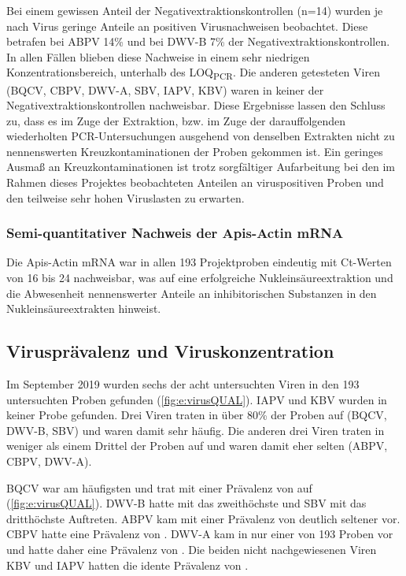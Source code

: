 Bei einem gewissen Anteil der Negativextraktionskontrollen (n=14) wurden je nach Virus geringe Anteile an positiven Virusnachweisen beobachtet. Diese betrafen bei ABPV 14\% und bei DWV-B 7\% der Negativextraktionskontrollen. In allen Fällen blieben diese Nachweise in einem sehr niedrigen Konzentrationsbereich, unterhalb des LOQ\textsubscript{PCR}. Die anderen getesteten Viren (BQCV, CBPV, DWV-A, SBV, IAPV, KBV) waren in keiner der Negativextraktionskontrollen nachweisbar. Diese Ergebnisse lassen den Schluss zu, dass es im Zuge der Extraktion, bzw. im Zuge der darauffolgenden wiederholten PCR-Untersuchungen ausgehend von denselben Extrakten nicht zu nennenswerten Kreuzkontaminationen der Proben gekommen ist. Ein geringes Ausmaß an Kreuzkontaminationen ist trotz sorgfältiger Aufarbeitung bei den im Rahmen dieses Projektes beobachteten Anteilen an viruspositiven Proben und den teilweise sehr hohen Viruslasten zu erwarten.

\subsubsection{Semi-quantitativer Nachweis der Apis-Actin mRNA}

Die Apis-Actin mRNA war in allen 193 Projektproben eindeutig mit Ct-Werten von 16 bis 24 nachweisbar, was auf eine erfolgreiche Nukleinsäureextraktion und die Abwesenheit nennenswerter Anteile an inhibitorischen Substanzen in den Nukleinsäureextrakten hinweist.

\subsection{Virusprävalenz und Viruskonzentration}

Im September 2019 wurden sechs der acht untersuchten Viren in den 193 untersuchten Proben gefunden (\cref{fig:e:virusQUAL}). IAPV und KBV wurden in keiner Probe gefunden. Drei Viren traten in über 80\% der Proben auf (BQCV, DWV-B, SBV) und waren damit sehr häufig. Die anderen drei Viren traten in weniger als einem Drittel der Proben auf und waren damit eher selten (ABPV, CBPV, DWV-A).

BQCV war am häufigsten und trat mit einer Prävalenz von  auf (\cref{fig:e:virusQUAL}). DWV-B hatte mit  das zweithöchste und SBV mit  das dritthöchste Auftreten. ABPV kam mit einer Prävalenz von  deutlich seltener vor. CBPV hatte eine Prävalenz von . DWV-A kam in nur einer von 193 Proben vor und hatte daher eine Prävalenz von . Die beiden nicht nachgewiesenen Viren KBV und IAPV hatten die idente Prävalenz von .

